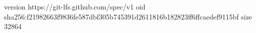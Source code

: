 version https://git-lfs.github.com/spec/v1
oid sha256:f21982663f9836fe587dbf305b745391d2611816b182823ff6ffcaedef9115bf
size 32864
